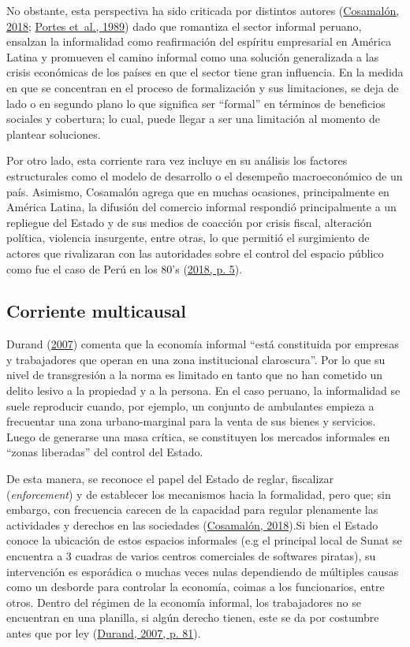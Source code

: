 \documentclass[
  letterpaper,
  12pt,
  oneside,
  spanish,
  doublespacing,
  headsepline,
  parskip]{MastersDoctoralThesis}
\begin{document}
No obstante, esta perspectiva ha sido criticada por distintos autores
(\protect\hyperlink{ref-cosamaluxf3n2018}{Cosamalón, 2018};
\protect\hyperlink{ref-theinfo1989}{Portes et~al., 1989}) dado que
romantiza el sector informal peruano, ensalzan la informalidad como
reafirmación del espíritu empresarial en América Latina y promueven el
camino informal como una solución generalizada a las crisis económicas
de los países en que el sector tiene gran influencia. En la medida en
que se concentran en el proceso de formalización y sus limitaciones, se
deja de lado o en segundo plano lo que significa ser ``formal'' en
términos de beneficios sociales y cobertura; lo cual, puede llegar a ser
una limitación al momento de plantear soluciones.

Por otro lado, esta corriente rara vez incluye en su análisis los
factores estructurales como el modelo de desarrollo o el desempeño
macroeconómico de un país. Asimismo, Cosamalón agrega que en muchas
ocasiones, principalmente en América Latina, la difusión del comercio
informal respondió principalmente a un repliegue del Estado y de sus
medios de coacción por crisis fiscal, alteración política, violencia
insurgente, entre otras, lo que permitió el surgimiento de actores que
rivalizaran con las autoridades sobre el control del espacio público
como fue el caso de Perú en los 80's
(\protect\hyperlink{ref-cosamaluxf3n2018}{2018, p. 5}).

\hypertarget{corriente-multicausal}{%
\subsection{Corriente multicausal}\label{corriente-multicausal}}

Durand (\protect\hyperlink{ref-durand2007}{2007}) comenta que la
economía informal ``está constituida por empresas y trabajadores que
operan en una zona institucional claroscura''. Por lo que su nivel de
transgresión a la norma es limitado en tanto que no han cometido un
delito lesivo a la propiedad y a la persona. En el caso peruano, la
informalidad se suele reproducir cuando, por ejemplo, un conjunto de
ambulantes empieza a frecuentar una zona urbano-marginal para la venta
de sus bienes y servicios. Luego de generarse una masa crítica, se
constituyen los mercados informales en ``zonas liberadas'' del control
del Estado.

De esta manera, se reconoce el papel del Estado de reglar, fiscalizar
(\emph{enforcement}) y de establecer los mecanismos hacia la formalidad,
pero que; sin embargo, con frecuencia carecen de la capacidad para
regular plenamente las actividades y derechos en las sociedades
(\protect\hyperlink{ref-cosamaluxf3n2018}{Cosamalón, 2018}).Si bien el
Estado conoce la ubicación de estos espacios informales (e.g el
principal local de Sunat se encuentra a 3 cuadras de varios centros
comerciales de softwares piratas), su intervención es esporádica o
muchas veces nulas dependiendo de múltiples causas como un desborde para
controlar la economía, coimas a los funcionarios, entre otros. Dentro
del régimen de la economía informal, los trabajadores no se encuentran
en una planilla, si algún derecho tienen, este se da por costumbre antes
que por ley (\protect\hyperlink{ref-durand2007}{Durand, 2007, p. 81}).
\end{document}
